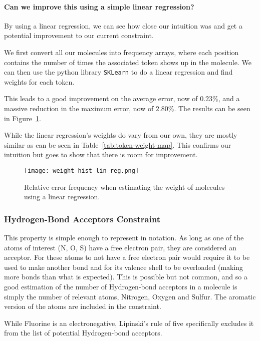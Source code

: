 \documentclass[../Document.tex]{subfiles}
\begin{document}
\paragraph{Can we improve this using a simple linear regression?}
By using a linear regression, we can see how close our intuition was and get a potential improvement to our current constraint.

We first convert all our molecules into frequency arrays, where each position contains the number of times the associated token shows up in the molecule. We can then use the python library \texttt{SKLearn} to do a linear regression and find weights for each token.

This leads to a good improvement on the average error, now of $0.23\%$, and a massive reduction in the maximum error, now of $2.80\%$. The results can be seen in Figure~\ref{fig:linreg-weight-estimation}.

While the linear regression's weights do vary from our own, they are mostly similar as can be seen in Table~\ref{tab:token-weight-map}. This confirms our intuition but goes to show that there is room for improvement.

\begin{figure}[ht]
    \centering
    \texttt{[image: weight\_hist\_lin\_reg.png]}
    \caption[Relative error frequency when estimating the weight of molecules using a linear regression]{Relative error frequency when estimating the weight of molecules using a linear regression.}
    \label{fig:linreg-weight-estimation}
\end{figure}


\subsubsection{Hydrogen-Bond Acceptors Constraint}
This property is simple enough to represent in \smiles notation. As long as one of the atoms of interest (\ie N, O, S) have a free electron pair, they are considered an acceptor. For these atoms to not have a free electron pair would require it to be used to make another bond and for its valence shell to be overloaded (\ie making more bonds than what is expected). This is possible but not common, and so a good estimation of the number of Hydrogen-bond acceptors in a molecule is simply the number of relevant atoms, \ie Nitrogen, Oxygen and Sulfur.
The aromatic version of the atoms are included in the constraint.

While Fluorine is an electronegative, Lipinski's rule of five specifically excludes it from the list of potential Hydrogen-bond acceptors\cite{LIPINSKI20013}.
\end{document}

